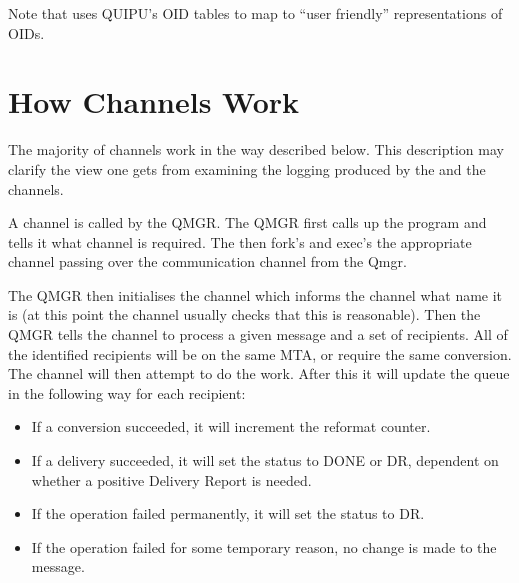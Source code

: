Note that  uses QUIPU's OID tables to map to ``user
friendly'' representations of OIDs.

\section{How Channels Work}\label{chan-op}

The majority of channels work in the way described below.
This description may clarify the view one gets from examining the
logging produced by the  and the channels.

A channel is called by the QMGR. The QMGR first calls up the
 program and tells it what channel is required. The
 then fork's and exec's the appropriate channel passing
over the communication channel from the Qmgr.

The QMGR then initialises the channel which informs the channel what
name it is (at this point the channel usually checks that this is
reasonable).  Then the QMGR tells the channel to process a given
message and a set of recipients.  All of the identified recipients
will be on the same MTA, or require the same conversion.  The channel
will then attempt to do the work.  After this it will update the queue
in the following way for each recipient:

\begin {itemize}
\item  If a conversion succeeded, it will increment the reformat counter.
\item If a delivery succeeded, it will set the status to DONE or DR, 
dependent on whether a positive Delivery Report is needed.
\item If the operation failed permanently, it will set the status to
DR.
\item If the operation failed for some temporary reason, no change is
made to the message.
\end {itemize}

